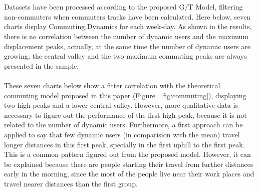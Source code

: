 \\
\\
Datasets have been processed according to the proposed G/T Model, filtering non-commuters when commuters tracks have been calculated. Here below, seven charts display Commuting Dynamics for each week-day.
As shown in the results, there is no correlation between the number of dynamic users and the maximum displacement peaks, actually, at the same time the number of dynamic users are growing, the central valley and the two maximum commuting peaks are always presented in the sample.
\\
\\
These seven charts below show a fitter correlation with the theoretical commuting model proposed in this paper (Figure ~\ref{fig:commuting}), displaying two high peaks and a lower central valley. However, more qualitative data is necessary to figure out the performance of the first high peak, because it is not related to the number of dynamic users. Furthermore, a first approach can be applied to say that few dynamic users (in comparision with the mean) travel longer distances in this first peak, specially in  the first uphill to the first peak. This is a common pattern figured out from the proposed model. However, it can be explained because there are people starting their travel from further distances early in the morning, since the most of the people live near their work places and travel nearer distances than the first group.  

\newpage

